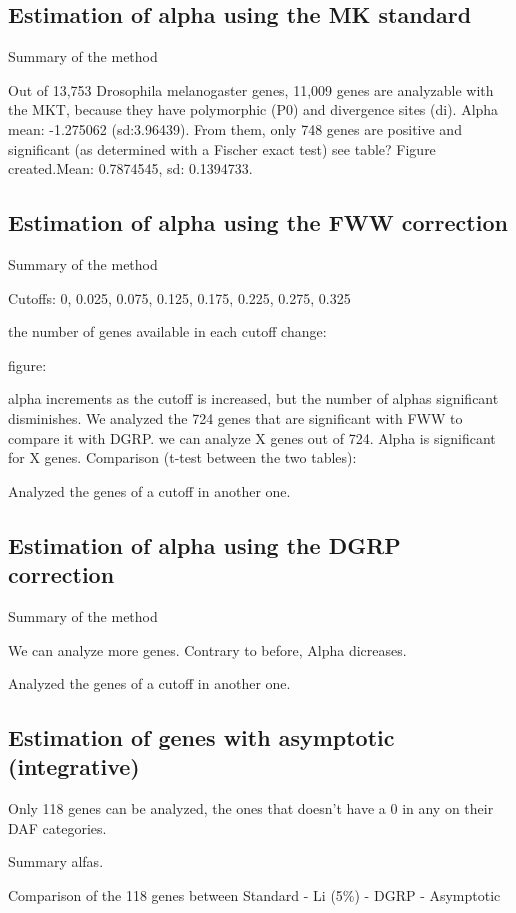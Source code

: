 \documentclass[a4paper]{article}
\begin{document}
\subsection{Estimation of alpha using the MK standard}
Summary of the method

Out of 13,753 Drosophila melanogaster genes, 11,009 genes are analyzable with the MKT, because they have polymorphic (P0) and divergence sites (di). Alpha mean: -1.275062 (sd:3.96439). From them, only 748 genes are positive and significant (as determined with a Fischer exact test) see table? Figure created.Mean: 0.7874545, sd: 0.1394733.


\subsection{Estimation of alpha using the FWW correction}
Summary of the method

Cutoffs: 0, 0.025, 0.075, 0.125, 0.175, 0.225, 0.275, 0.325

the number of genes available in each cutoff change:

figure:

alpha increments as the cutoff is increased, but the number of alphas significant disminishes.
We analyzed the 724 genes that are significant with FWW to compare it with DGRP. we can analyze X genes out of 724. Alpha is significant for X genes. Comparison (t-test between the two tables):

Analyzed the genes of a cutoff in another one.

\subsection{Estimation of alpha using the DGRP correction}
Summary of the method

We can analyze more genes.
Contrary to before, Alpha dicreases.

Analyzed the genes of a cutoff in another one.

\subsection{Estimation of genes with asymptotic (integrative)}
Only 118 genes can be analyzed, the ones that doesn't have a 0 in any on their DAF categories. 

Summary alfas.

Comparison of the 118 genes between
Standard - Li (5\%) - DGRP - Asymptotic 






\end{document}

